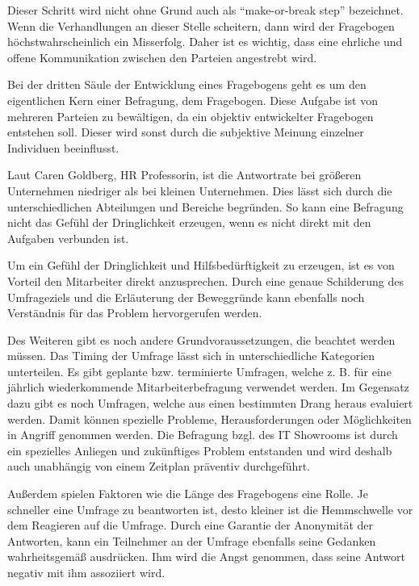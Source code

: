 Dieser Schritt wird nicht ohne Grund auch als \enquote{make-or-break step} bezeichnet. 
Wenn die Verhandlungen an dieser Stelle scheitern, dann wird der Fragebogen höchstwahrscheinlich ein Misserfolg.
Daher ist es wichtig, dass eine ehrliche und offene Kommunikation zwischen den Parteien angestrebt wird.

Bei der dritten Säule der Entwicklung eines Fragebogens geht es um den eigentlichen Kern einer Befragung, dem Fragebogen.
Diese Aufgabe ist von mehreren Parteien zu bewältigen, da ein objektiv entwickelter Fragebogen entstehen soll.
Dieser wird sonst durch die subjektive Meinung einzelner Individuen beeinflusst\autocite[S.21]{2009Fragebogen}.

Laut Caren Goldberg, HR Professorin, ist die Antwortrate bei größeren Unternehmen niedriger als bei kleinen Unternehmen.
Dies lässt sich durch die unterschiedlichen Abteilungen und Bereiche begründen.
So kann eine Befragung nicht das Gefühl der Dringlichkeit erzeugen, wenn es nicht direkt mit den Aufgaben verbunden ist. 

Um ein Gefühl der Dringlichkeit und Hilfsbedürftigkeit zu erzeugen, ist es von Vorteil den Mitarbeiter direkt anzusprechen.
Durch eine genaue Schilderung des Umfrageziels und die Erläuterung der Beweggründe kann ebenfalls noch Verständnis für das Problem hervorgerufen werden.

Des Weiteren gibt es noch andere Grundvoraussetzungen, die beachtet werden müssen.
Das Timing der Umfrage lässt sich in unterschiedliche Kategorien unterteilen.
Es gibt geplante bzw. terminierte Umfragen, welche z. B. für eine jährlich wiederkommende Mitarbeiterbefragung verwendet werden.
Im Gegensatz dazu gibt es noch Umfragen, welche aus einen bestimmten Drang heraus evaluiert werden.
Damit können spezielle Probleme, Herausforderungen oder Möglichkeiten in Angriff genommen werden.
Die Befragung bzgl. des IT Showrooms ist durch ein spezielles Anliegen und zukünftiges Problem entstanden und wird deshalb auch unabhängig von einem Zeitplan präventiv durchgeführt\autocite[Timing is Everything]{Perfect}.

Außerdem spielen Faktoren wie die Länge des Fragebogens eine Rolle. Je schneller eine Umfrage zu beantworten ist, desto kleiner ist die Hemmschwelle vor dem Reagieren auf die Umfrage.
Durch eine Garantie der Anonymität der Antworten, kann ein Teilnehmer an der Umfrage ebenfalls seine Gedanken wahrheitsgemäß ausdrücken.
Ihm wird die Angst genommen, dass seine Antwort negativ mit ihm assoziiert wird\autocite[Chapter 4
Putting It Together]{Perfect}.

